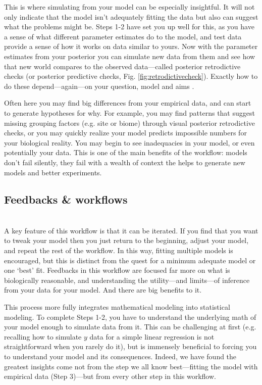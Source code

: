 \documentclass[11pt]{article}
\begin{document}
This is where simulating from your model can be especially insightful. It will not only indicate that the model isn't adequately fitting the data but also can suggest what the problems might be. Steps 1-2 have set you up well for this, as you have a sense of what different parameter estimates do to the model, and test data provide a sense of how it works on data similar to yours. Now with the parameter estimates from your posterior you can simulate new data from them and see how that new world compares to the observed data---called posterior retrodictive checks (or posterior predictive checks, Fig. \ref{fig:retrodictivecheck}). Exactly how to do these depend---again---on your question, model and aims \citep[see][]{held2010,gelman200ppc,conn2018}. 

Often here you may find big differences from your empirical data, and can start to generate hypotheses for why. For example, you may find patterns that suggest missing grouping factors (e.g. site or biome) through visual posterior retrodictive checks, or you may quickly realize your model predicts impossible numbers for your biological reality. You may begin to see inadequacies in your model, or even potentially your data.  This is one of the main benefits of the workflow: models don't fail silently, they fail with a wealth of context the helps to generate new models and better experiments.

\subsection*{Feedbacks \& workflows}\\
A key feature of this workflow is that it can be iterated.  If you find that you want to tweak your model then you just return to the beginning, adjust your model, and repeat the rest of the workflow. In this way, fitting multiple models is encouraged, but this is distinct from the quest for a minimum adequate model or one `best' fit. Feedbacks in this workflow are focused far more on what is biologically reasonable, and understanding the utility---and limits---of inference from your data for your model.  And there are big benefits to it. 

This process more fully integrates mathematical modeling into statistical modeling. To complete Steps 1-2, you have to understand the underlying math of your model enough to simulate data from it. This can be challenging at first (e.g. recalling how to simulate $y$ data for a simple linear regression is not straightforward when you rarely do it), but is immensely beneficial to forcing you to understand your model and its consequences. Indeed, we have found the greatest insights come not from the step we all know best---fitting the model with empirical data (Step 3)---but from every other step in this workflow. 
\end{document}
